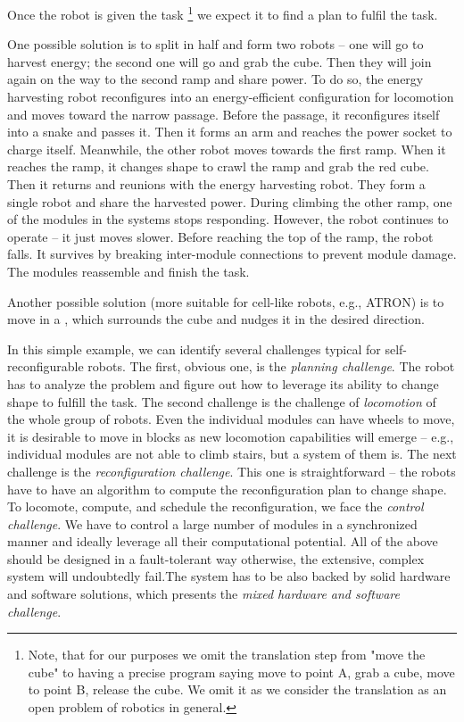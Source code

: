 Once the robot is given the task \footnote{Note, that for our purposes we omit
the translation step from "move the cube" to having a precise program saying
move to point A, grab a cube, move to point B, release the cube. We omit it as
we consider the translation as an open problem of robotics in general.} we
expect it to find a plan to fulfil the task.

One possible solution is to split in half and form two robots -- one will go to
harvest energy; the second one will go and grab the cube. Then they will join
again on the way to the second ramp and share power. To do so, the energy
harvesting robot reconfigures into an energy-efficient configuration for
locomotion and moves toward the narrow passage. Before the passage, it
reconfigures itself into a snake and passes it. Then it forms an arm and reaches
the power socket to charge itself. Meanwhile, the other robot moves towards the
first ramp. When it reaches the ramp, it changes shape to crawl the ramp and
grab the red cube. Then it returns and reunions with the energy harvesting
robot. They form a single robot and share the harvested power. During climbing
the other ramp, one of the modules in the systems stops responding. However, the
robot continues to operate -- it just moves slower. Before reaching the top of
the ramp, the robot falls. It survives by breaking inter-module connections to
prevent module damage. The modules reassemble and finish the task.

Another possible solution (more suitable for cell-like robots, e.g., ATRON) is
to move in a , which surrounds the cube and nudges it
in the desired direction.

In this simple example, we can identify several challenges typical for
self-reconfigurable robots. The first, obvious one, is the \emph{planning
challenge}. The robot has to analyze the problem and figure out how to leverage
its ability to change shape to fulfill the task. The second challenge is the
challenge of \emph{locomotion} of the whole group of robots. Even the individual
modules can have wheels to move, it is desirable to move in blocks as new
locomotion capabilities will emerge -- e.g., individual modules are not able to
climb stairs, but a system of them is. The next challenge is the
\emph{reconfiguration challenge}. This one is straightforward -- the robots have
to have an algorithm to compute the reconfiguration plan to change shape. To
locomote, compute, and schedule the reconfiguration, we face the \emph{control
challenge}. We have to control a large number of modules in a synchronized
manner and ideally leverage all their computational potential. All of the above
should be designed in a fault-tolerant way otherwise, the extensive, complex
system will undoubtedly fail.The system has to be also backed by solid hardware
and software solutions, which presents the \emph{mixed hardware and software
challenge}.

